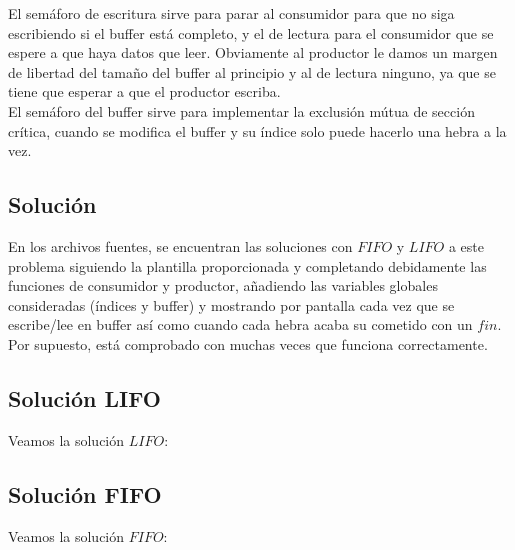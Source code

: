 \documentclass[11pt]{article}
\theoremstyle{ejercicio-style}
\begin{document}
El semáforo de escritura sirve para parar al consumidor para que no siga escribiendo si el buffer está completo, y el de lectura para el consumidor que se espere a que haya datos que leer. Obviamente al productor le damos un margen de libertad del tamaño del buffer al principio y al de lectura ninguno, ya que se tiene que esperar a que el productor escriba. \\

El semáforo del buffer sirve para implementar la exclusión mútua de sección crítica, cuando se modifica el buffer y su índice solo puede hacerlo una hebra a la vez.

\subsection*{Solución}
\label{sec::solucion}
En los archivos fuentes, se encuentran las soluciones con $FIFO$ y $LIFO$ a este problema siguiendo la plantilla proporcionada y completando debidamente las funciones de consumidor y productor, añadiendo las variables globales consideradas (índices y buffer) y mostrando por pantalla cada vez que se escribe/lee en buffer así como cuando cada hebra acaba su cometido con un $fin$. Por supuesto, está comprobado con muchas veces que funciona correctamente.

\subsection*{Solución LIFO}
Veamos la solución $LIFO$:


\subsection*{Solución FIFO}
Veamos la solución $FIFO$:

\end{document}
